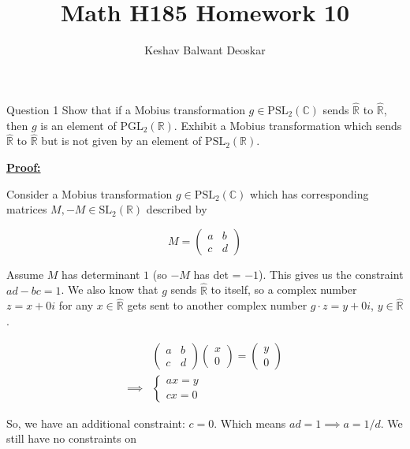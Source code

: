 \documentclass{article}
\title{Math H185 Homework 10}
\author{Keshav Balwant Deoskar}
\newcommand{\R}{\mathbb{R}}
\newcommand{\C}{\mathbb{C}}
\begin{document}
\maketitle


\begin{mathdefinitionbox}{Question 1}
\vskip 0.5cm
Show that if a Mobius transformation $g \in \mathrm{PSL}_2(\C)$ sends $\hat{\R}$ to $\hat{\R}$, then $g$ is an element of $\mathrm{PGL}_2(\R)$. Exhibit a Mobius transformation which sends $\hat{\R}$ to $\hat{\R}$ but is not given by an element of $\mathrm{PSL}_2(\R)$.
\end{mathdefinitionbox}

\vskip 0.5cm
\underline{\textbf{Proof:}}

Consider a  Mobius transformation $g \in \mathrm{PSL}_2(\C)$ which has corresponding matrices $M, -M \in \mathrm{SL}_2(\R)$ described by 

\[ M = \begin{pmatrix}
  a & b \\
  c & d
\end{pmatrix} \]

Assume $M$ has determinant $1$ (so $-M$ has det = $-1$). This gives us the constraint $ad - bc = 1$. We also know that $g$ sends $\hat{\R}$ to itself, so a complex number $z = x + 0i$ for any $x \in \hat{\R}$ gets sent to another complex number $g \cdot z = y + 0i$, $y \in \hat{\R}$.

\begin{align*}
  &\begin{pmatrix}
    a & b \\
    c & d
  \end{pmatrix} \begin{pmatrix}
    x \\ 0
  \end{pmatrix} = \begin{pmatrix}
    y \\ 0
  \end{pmatrix} \\
  \implies&\begin{cases}
    ax = y \\
    cx = 0
  \end{cases}
\end{align*}

So, we have an additional constraint: $c = 0$. Which means $ad = 1 \implies a = 1/d$. We still have no constraints on 
\end{document}
